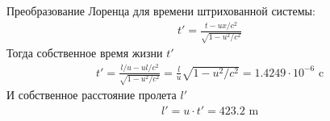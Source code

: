 \documentclass[a5paper,10pt]{article}\usepackage[usenames,dvipsnames]{color}\usepackage{extsizes,cmap,graphicx,misccorr,indentfirst,makecell,multirow,ulem,geometry,amssymb,amsfonts,amsmath,amsthm,titlesec,float,fancyhdr,wrapfig,tikz}\usepackage[T2A]{fontenc}\usepackage[utf8x]{inputenc}\usepackage[english, russian]{babel}\usetikzlibrary{decorations.pathreplacing,decorations.pathmorphing,patterns,calc,scopes,arrows,through,positioning,shapes.misc}\graphicspath{{img/}}\linespread{1.3}\frenchspacing\geometry{left=1cm, right=1cm, top=2cm, bottom=1cm, bindingoffset=0cm}\pagestyle{fancy}\fancyhead{}\fancyhead[R]{Сарафанов Ф.Г.}
\begin{document}
Преобразование Лоренца для времени штрихованной системы:
\begin{gather*}
    t'=\frac{t-ux/c^2}{\sqrt{1-u^2/c^2}}
\end{gather*}
Тогда собственное время жизни $t'$
\begin{gather*}
    t'=\frac{l/u-ul/c^2}{\sqrt{1-u^2/c^2}}=\frac{l}{u}\sqrt{1-u^2/c^2}=1.4249\cdot{10}^{-6}\text{ c}
\end{gather*}
И собственное расстояние пролета $l'$
\begin{gather*}
    l'=u\cdot{t'}=423.2\text{ m}
\end{gather*}
\end{document}
